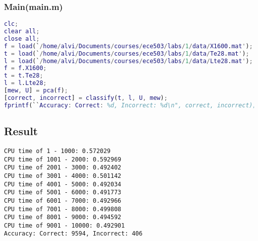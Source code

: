 \subsubsection{Main(main.m)}
\begin{lstlisting}[language=Matlab]
clc;
clear all;
close all;
f = load(`/home/alvi/Documents/courses/ece503/labs/1/data/X1600.mat');
t = load(`/home/alvi/Documents/courses/ece503/labs/1/data/Te28.mat');
l = load(`/home/alvi/Documents/courses/ece503/labs/1/data/Lte28.mat');
f = f.X1600;
t = t.Te28;
l = l.Lte28;
[mew, U] = pca(f);
[correct, incorrect] = classify(t, l, U, mew);
fprintf(``Accuracy: Correct: %d, Incorrect: %d\n", correct, incorrect);
\end{lstlisting}


\subsection{Result}
\label{subsect:result}
\begin{verbatim}
CPU time of 1 - 1000: 0.572029
CPU time of 1001 - 2000: 0.592969
CPU time of 2001 - 3000: 0.492402
CPU time of 3001 - 4000: 0.501142
CPU time of 4001 - 5000: 0.492034
CPU time of 5001 - 6000: 0.491773
CPU time of 6001 - 7000: 0.492966
CPU time of 7001 - 8000: 0.499808
CPU time of 8001 - 9000: 0.494592
CPU time of 9001 - 10000: 0.492901
Accuracy: Correct: 9594, Incorrect: 406
\end{verbatim}